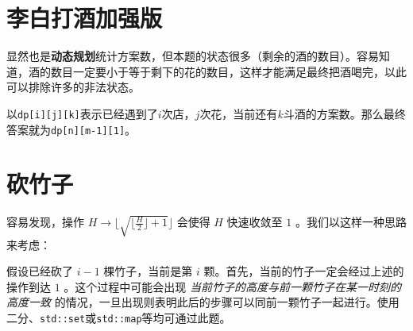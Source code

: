 \documentclass[12pt, a4paper, UTF8]{ctexart}
\newcommand{\cppinput}[1]{
  
}
\begin{document}
\section{李白打酒加强版}

显然也是\textbf{动态规划}统计方案数，但本题的状态很多（剩余的酒的数目）。容易知道，酒的数目一定要小于等于剩下的花的数目，这样才能满足最终把酒喝完，以此可以排除许多的非法状态。

以\texttt{dp[i][j][k]}表示已经遇到了$i$次店，$j$次花，当前还有$k$斗酒的方案数。那么最终答案就为\texttt{dp[n][m-1][1]}。
\cppinput{I.cpp}

\section{砍竹子}
容易发现，操作 $H \rightarrow \lfloor\sqrt{\lfloor\frac{H}{2}\rfloor+1}\rfloor$ 会使得 $H$ 快速收敛至 $1$ 。我们以这样一种思路来考虑：

假设已经砍了 $i-1$ 棵竹子，当前是第 $i$ 颗。首先，当前的竹子一定会经过上述的操作到达 $1$ 。这个过程中可能会出现 \emph{当前竹子的高度与前一颗竹子在某一时刻的高度一致} 的情况，一旦出现则表明此后的步骤可以同前一颗竹子一起进行。使用二分、\texttt{std::set}或\texttt{std::map}等均可通过此题。
\cppinput{J.cpp}
\end{document}
